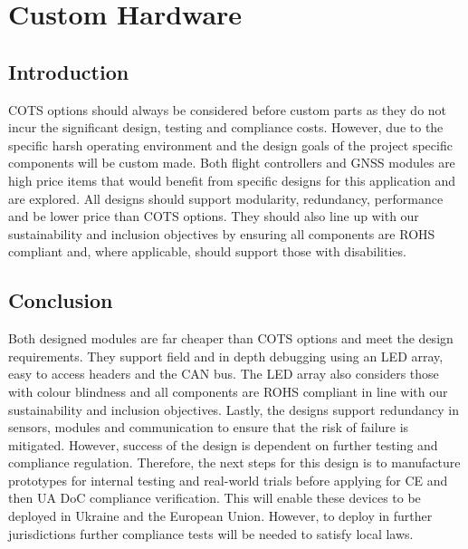 \newpage
{}
\section{Custom Hardware} \label{section:Custom Hardware}
\subsection{Introduction}\label{sub_section:tgt_custom_hardware_intro}
\gls{COTS} options should always be considered before custom parts as they do not incur the significant design, testing and compliance costs. However, due to the specific harsh operating environment and the design goals of the project specific components will be custom made. Both flight controllers and \gls{GNSS} modules are high price items that would benefit from specific designs for this application and are explored. All designs should support modularity, redundancy, performance and be lower price than \gls{COTS} options. They should also line up with our sustainability and inclusion objectives by ensuring all components are \gls{ROHS} compliant and, where applicable, should support those with disabilities.





\subsection{Conclusion}
Both designed modules are far cheaper than \gls{COTS} options and meet the design requirements. They support field and in depth debugging using an \gls{LED} array, easy to access headers and the \gls{CAN} bus. The LED array also considers those with colour blindness and all components are \gls{ROHS} compliant in line with our sustainability and inclusion objectives. Lastly, the designs support redundancy in sensors, modules and communication to ensure that the risk of failure is mitigated. However, success of the design is dependent on further testing and compliance regulation. Therefore, the next steps for this design is to manufacture prototypes for internal testing and real-world trials before applying for CE and then UA DoC compliance verification. This will enable these devices to be deployed in Ukraine and the European Union. However, to deploy in further jurisdictions further compliance tests will be needed to satisfy local laws. 